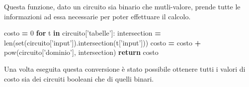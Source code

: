 \documentclass[]{book}
\newenvironment{Shaded}{\begin{snugshade}}{\end{snugshade}}
\newcommand{\BuiltInTok}[1]{#1}
\newcommand{\ControlFlowTok}[1]{\textcolor[rgb]{0.13,0.29,0.53}{\textbf{#1}}}
\newcommand{\DecValTok}[1]{\textcolor[rgb]{0.00,0.00,0.81}{#1}}
\newcommand{\KeywordTok}[1]{\textcolor[rgb]{0.13,0.29,0.53}{\textbf{#1}}}
\newcommand{\NormalTok}[1]{#1}
\newcommand{\OperatorTok}[1]{\textcolor[rgb]{0.81,0.36,0.00}{\textbf{#1}}}
\newcommand{\StringTok}[1]{\textcolor[rgb]{0.31,0.60,0.02}{#1}}
\begin{document}
\newpage

Questa funzione, dato un circuito sia binario che mutli-valore, prende tutte le informazioni ad essa necessarie per poter effettuare il calcolo.

\begin{Shaded}
\begin{Highlighting}[]
\NormalTok{costo }\OperatorTok{=} \DecValTok{0}
\ControlFlowTok{for}\NormalTok{ t }\KeywordTok{in}\NormalTok{ circuito[}\StringTok{'tabelle'}\NormalTok{]:}
\NormalTok{  intersection }\OperatorTok{=} \BuiltInTok{len}\NormalTok{(}\BuiltInTok{set}\NormalTok{(circuito[}\StringTok{'input'}\NormalTok{]).intersection(t[}\StringTok{'input'}\NormalTok{]))}
\NormalTok{  costo }\OperatorTok{=}\NormalTok{ costo }\OperatorTok{+} \BuiltInTok{pow}\NormalTok{(circuito[}\StringTok{'dominio'}\NormalTok{], intersection)}
\ControlFlowTok{return}\NormalTok{ costo}
\end{Highlighting}
\end{Shaded}

Una volta eseguita questa conversione è stato possibile ottenere tutti i valori di costo sia dei circuiti booleani che di quelli binari.
\end{document}
